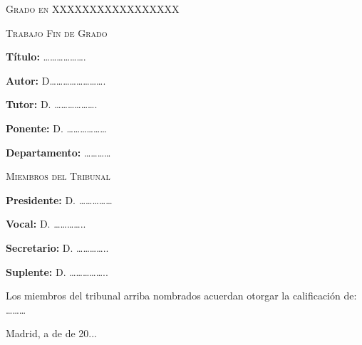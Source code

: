 \begin{titlepage}
\Large{\textsc{\textcolor{nar}{Grado en XXXXXXXXXXXXXXXXX}}} \par
\vspace{0.3cm}
\colorbox{nar}{\Large{\textsc{Trabajo Fin de Grado}}} \par
\vspace{0.2cm}
\normalsize{\textbf{Título:} ……………….} \par
\vspace{0.2cm}
\normalsize{\textbf{Autor:} D…………………….} \par
\vspace{0.2cm}
\normalsize{\textbf{Tutor:} D. ……………….} \par
\vspace{0.2cm}
\normalsize{\textbf{Ponente:} D. ………………} \par
\vspace{0.2cm}
\normalsize{\textbf{Departamento:} …………} \par
\vspace{1cm}
\colorbox{nar}{\Large{\textsc{Miembros del Tribunal}}} \par
\vspace{0.2cm}
\normalsize{\textbf{Presidente:} D. ……………} \par
\vspace{0.2cm}
\normalsize{\textbf{Vocal:} D. …………..} \par
\vspace{0.2cm}
\normalsize{\textbf{Secretario:} D. …………..} \par
\vspace{0.2cm}
\normalsize{\textbf{Suplente:} D. ……………..} \par
\vspace{0.8cm}
\normalsize{\quad \quad \quad       Los miembros del tribunal arriba nombrados acuerdan otorgar la calificación de: ………} \par
\vspace{2cm}
\flushright
\normalsize{Madrid, a \quad \quad\quad de \quad \quad\quad\quad\quad\quad\quad de 20...} \par
\end{titlepage}